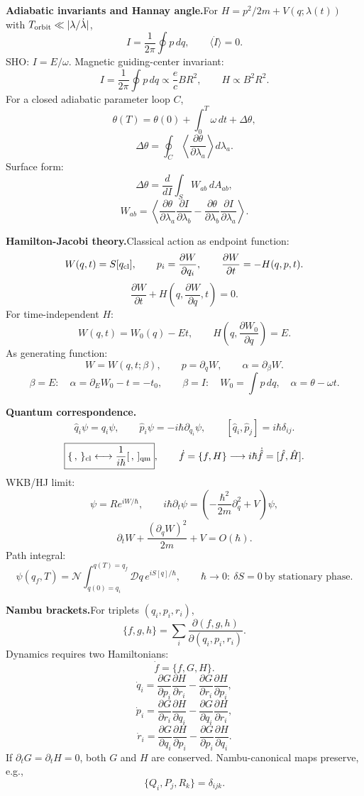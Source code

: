 \noindent\textbf{Adiabatic invariants and Hannay angle.}\quad For
$H=p^2/2m+V(q;\lambda(t))$ with
$T_{\rm orbit}\ll|\lambda/\dot\lambda|$,
\[
\boxed{I=\frac{1}{2\pi}\oint p\,dq,\qquad \langle\dot I\rangle=0}.
\]
SHO: $I=E/\omega$. Magnetic guiding-center invariant:
\[
I=\frac{1}{2\pi}\oint p\,dq\propto\frac{e}{c}BR^2,\qquad
H\propto B^2R^2.
\]
For a closed adiabatic parameter loop $C$,
\[
\theta(T)=\theta(0)+\int_0^T\omega\,dt+\Delta\theta,
\]
\[
\Delta\theta=\oint_C
\left\langle\frac{\partial\theta}{\partial\lambda_a}\right\rangle d\lambda_a.
\]
Surface form:
\[
\Delta\theta=\frac{d}{dI}\int_S W_{ab}\,dA_{ab},
\]
\[
W_{ab}=
\left\langle
\frac{\partial\theta}{\partial\lambda_a}\frac{\partial I}{\partial\lambda_b}
-\frac{\partial\theta}{\partial\lambda_b}\frac{\partial I}{\partial\lambda_a}
\right\rangle .
\]

\noindent\textbf{Hamilton-Jacobi theory.}\quad Classical action as endpoint function:
\[
W(q,t)=S[q_{\rm cl}],\qquad
p_i=\frac{\partial W}{\partial q_i},\qquad
\frac{\partial W}{\partial t}=-H(q,p,t).
\]
\[
\boxed{\frac{\partial W}{\partial t}
+H\left(q,\frac{\partial W}{\partial q},t\right)=0}.
\]
For time-independent $H$:
\[
W(q,t)=W_0(q)-Et,\qquad
H\left(q,\frac{\partial W_0}{\partial q}\right)=E.
\]
As generating function:
\[
W=W(q,t;\beta),\qquad p=\partial_qW,\qquad \alpha=\partial_\beta W.
\]
\[
\beta=E:\quad \alpha=\partial_EW_0-t=-t_0,
\qquad
\beta=I:\quad W_0=\int p\,dq,\quad \alpha=\theta-\omega t.
\]

\noindent\textbf{Quantum correspondence.}\quad
\[
\hat q_i\psi=q_i\psi,\qquad
\hat p_i\psi=-i\hbar\partial_{q_i}\psi,\qquad
[\hat q_i,\hat p_j]=i\hbar\delta_{ij}.
\]
\[
\boxed{\{\, ,\,\}_{\rm cl}\longleftrightarrow\frac{1}{i\hbar}[\, ,\,]_{\rm qm}},
\qquad
\dot f=\{f,H\}\longrightarrow i\hbar\dot{\hat f}=[\hat f,\hat H].
\]
WKB/HJ limit:
\[
\psi=R e^{iW/\hbar},\qquad
i\hbar\partial_t\psi=
\left(-\frac{\hbar^2}{2m}\partial_q^2+V\right)\psi,
\]
\[
\partial_tW+\frac{(\partial_qW)^2}{2m}+V=O(\hbar).
\]
Path integral:
\[
\psi(q_f,T)=\mathcal N
\int_{q(0)=q_i}^{q(T)=q_f}\mathcal Dq\,e^{iS[q]/\hbar},
\qquad
\hbar\to0:\ \delta S=0\ \text{by stationary phase}.
\]

\noindent\textbf{Nambu brackets.}\quad For triplets $(q_i,p_i,r_i)$,
\[
\boxed{\{f,g,h\}=\sum_i
\frac{\partial(f,g,h)}{\partial(q_i,p_i,r_i)}}.
\]
Dynamics requires two Hamiltonians:
\[
\dot f=\{f,G,H\}.
\]
\[
\dot q_i=
\frac{\partial G}{\partial p_i}\frac{\partial H}{\partial r_i}
-\frac{\partial G}{\partial r_i}\frac{\partial H}{\partial p_i},
\]
\[
\dot p_i=
\frac{\partial G}{\partial r_i}\frac{\partial H}{\partial q_i}
-\frac{\partial G}{\partial q_i}\frac{\partial H}{\partial r_i},
\]
\[
\dot r_i=
\frac{\partial G}{\partial q_i}\frac{\partial H}{\partial p_i}
-\frac{\partial G}{\partial p_i}\frac{\partial H}{\partial q_i}.
\]
If $\partial_tG=\partial_tH=0$, both $G$ and $H$ are conserved. Nambu-canonical
maps preserve, e.g.,
\[
\{Q_i,P_j,R_k\}=\delta_{ijk}.
\]
